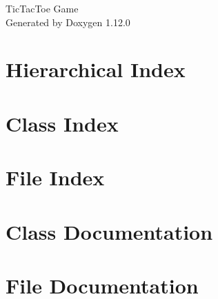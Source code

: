 \documentclass[twoside]{book}
\newcommand{\+}{\discretionary{\mbox{\scriptsize$\hookleftarrow$}}{}{}}
\newcommand{\clearemptydoublepage}{%
    \newpage{\pagestyle{empty}\cleardoublepage}%
  }
\begin{document}
  \raggedbottom
    \hypersetup{pageanchor=false,
                bookmarksnumbered=true,
                pdfencoding=unicode
               }
  \begin{titlepage}
  \vspace*{7cm}
  \begin{center}%
  {\Large Tic\+Tac\+Toe Game}\\
  \vspace*{1cm}
  {\large Generated by Doxygen 1.12.0}\\
  \end{center}
  \end{titlepage}
  \clearemptydoublepage
  \tableofcontents
  \clearemptydoublepage
  \hypersetup{pageanchor=true}
\chapter{Hierarchical Index}

\chapter{Class Index}

\chapter{File Index}

\chapter{Class Documentation}



\chapter{File Documentation}






  \backmatter
  \newpage
  \clearemptydoublepage
  \printindex
\end{document}
